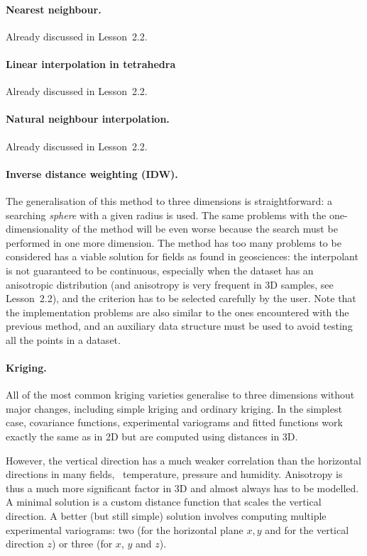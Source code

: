 \paragraph{Nearest neighbour.} 
Already discussed in Lesson~2.2.

\paragraph{Linear interpolation in tetrahedra}
Already discussed in Lesson~2.2.

\paragraph{Natural neighbour interpolation.}
Already discussed in Lesson~2.2.

\paragraph{Inverse distance weighting (\textbf{IDW}).}
The generalisation of this method to three dimensions is straightforward: a searching \emph{sphere} with a given radius is used. 
The same problems with the one-dimensionality of the method will be even worse because the search must be performed in one more dimension. 
The method has too many problems to be considered  has a viable solution for fields as found in geosciences: the interpolant is not guaranteed to be continuous, especially when the dataset has an anisotropic distribution (and anisotropy is very frequent in 3D samples, see Lesson~2.2), and the criterion has to be selected carefully by the user.
Note that the implementation problems are also similar to the ones encountered with the previous method, and an auxiliary data structure must be used to avoid testing all the points in a dataset.

\paragraph{Kriging.}
All of the most common kriging varieties generalise to three dimensions without major changes, including simple kriging and ordinary kriging.
In the simplest case, covariance functions, experimental variograms and fitted functions work exactly the same as in 2D but are computed using distances in 3D.

However, the vertical direction has a much weaker correlation than the horizontal directions in many fields, \eg\ temperature, pressure and humidity.
Anisotropy is thus a much more significant factor in 3D and almost always has to be modelled.
A minimal solution is a custom distance function that scales the vertical direction.
A better (but still simple) solution involves computing multiple experimental variograms: two (for the horizontal plane \(x,y\) and for the vertical direction \(z\)) or three (for \(x\), \(y\) and \(z\)).

